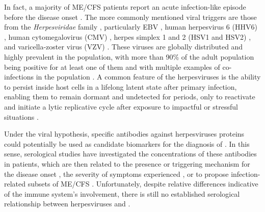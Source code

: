 In fact, a majority of ME/CFS patients report an acute infection-like episode before the disease onset \citep{chu2019OnsetPatterns}.
The more commonly mentioned viral triggers are those from the \textit{Herpesviridae} family \citep{blombergAntibodiesHumanHerpesviruses2019, ariza2021MyalgicEncephalomyelitis}, particularly EBV \citep{ruiz-pablos2021EpsteinBarrVirus}, human herpesvirus 6 (HHV6) \citep{lee2021SalivaryDNA, kasimir2022TissueSpecific}, human cytomegalovirus (CMV) \citep{lerner2002IgMSerum}, herpes simplex 1 and 2 (HSV1 and HSV2) \citep{bond2006AntibodiesHerpes}, and varicella-zoster virus (VZV) \citep{tsai2014IncreasedRisk, halpin2017MyalgicEncephalomyelitis}.
These viruses are globally distributed and highly prevalent in the population, with more than 90\% of the adult population being positive for at least one of them and with multiple examples of co-infections in the population \citep{rasa2018ChronicViral}.
A common feature of the herpesviruses is the ability to persist inside host cells in a lifelong latent state after primary infection, enabling them to remain dormant and undetected for periods, only to reactivate and initiate a lytic replicative cycle after exposure to impactful or stressful situations \citep{lan2017HerpesvirusesEpidemiology, rooney2019HerpesVirus}.


Under the viral hypothesis, specific antibodies against herpesviruses proteins could potentially be used as candidate biomarkers for the diagnosis of \cfs.
In this sense, serological studies have investigated the concentrations of these antibodies in patients, which are then related to the presence or triggering mechanism for the disease onset \citep{loebel2017SerologicalProfiling, blombergAntibodiesHumanHerpesviruses2019}, the severity of symptoms experienced \citep{domingues2023AssociationAnalysis}, or to propose infection-related subsets of ME/CFS \citep{eriksen2018MECFS}.
Unfortunately, despite relative differences indicative of the immune system's involvement, there is still no established serological relationship between herpesviruses and \cfs \citep{ariza2020CommentaryAntibodies}.


